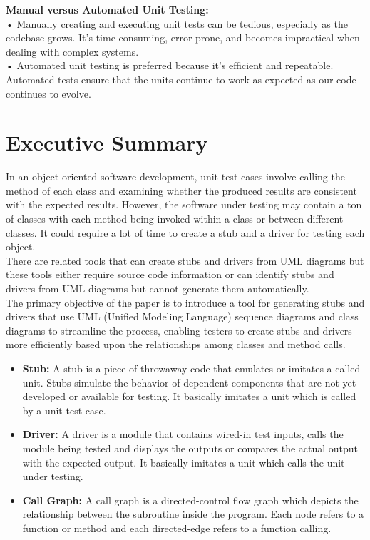 \documentclass{article}
\begin{document}
\textbf{Manual versus Automated Unit Testing: }\\

• Manually creating and executing unit tests can be tedious, especially as the codebase grows. It's time-consuming, error-prone, and becomes impractical when dealing with complex systems.\\

• Automated unit testing is preferred because it's efficient and repeatable. Automated tests ensure that the units continue to work as expected as our code continues to evolve.\\


\section{Executive Summary}
In an object-oriented software development, unit test cases involve calling the method of each class and examining whether the produced results are consistent with the expected results. However, the software under testing may contain a ton of classes with each method being invoked within a class or between different classes. It could require a lot of time to create a stub and a driver for testing each object.\\

There are related tools that can create stubs and drivers from UML diagrams but these tools either require source code information or can identify stubs and drivers from UML diagrams but cannot generate them automatically.\\

The primary objective of the paper is to introduce a tool for generating stubs and drivers that use  UML (Unified Modeling Language) sequence diagrams and class diagrams to streamline the process, enabling testers to create stubs and drivers more efficiently based upon the relationships among classes and method calls.\\


\begin{itemize}
    \item \textbf{Stub:} A stub is a piece of throwaway code that emulates or imitates a called unit. Stubs simulate the behavior of dependent components that are not yet developed or available for testing. It basically imitates a unit which is called by a unit test case.
    \item \textbf{Driver:} A driver is a module that contains wired-in test inputs, calls the module being tested and displays the outputs or compares the actual output with the expected output. It basically imitates a unit which calls the unit under testing.
    \item \textbf{Call Graph:} A call graph is a directed-control flow graph which depicts the relationship between the subroutine inside the program. Each node refers to a function or method and each directed-edge refers to a function calling. 
\end{itemize}
    
\end{document}
